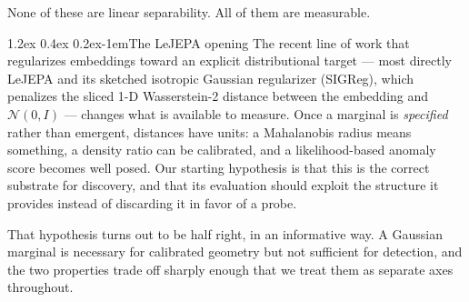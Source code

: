 \documentclass{article}
\makeatletter
\renewcommand\paragraph{\@startsection{paragraph}{4}{\z@}%
  {1.2ex \@plus 0.4ex \@minus 0.2ex}{-1em}{\normalsize\bf}}
\newcommand{\N}{\mathcal{N}}
\makeatother
\begin{document}
None of these are linear separability. All of them are measurable.

\paragraph{The LeJEPA opening}
The recent line of work that regularizes embeddings toward an explicit
distributional target --- most directly LeJEPA and its sketched isotropic
Gaussian regularizer (SIGReg), which penalizes the sliced 1-D Wasserstein-2
distance between the embedding and $\N(0,I)$ --- changes what is available to
measure. Once a marginal is \emph{specified} rather than emergent, distances
have units: a Mahalanobis radius means something, a density ratio can be
calibrated, and a likelihood-based anomaly score becomes well posed. Our
starting hypothesis is that this is the correct substrate for discovery, and
that its evaluation should exploit the structure it provides instead of
discarding it in favor of a probe.

That hypothesis turns out to be half right, in an informative way. A Gaussian
marginal is necessary for calibrated geometry but not sufficient for
detection, and the two properties trade off sharply enough that we treat them
as separate axes throughout.
\end{document}

